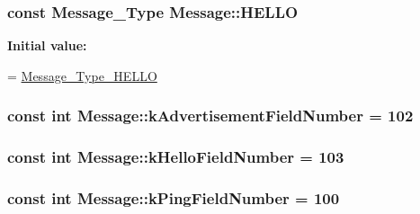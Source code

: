 \subsubsection[{\texorpdfstring{H\+E\+L\+LO}{HELLO}}]{\setlength{\rightskip}{0pt plus 5cm}const {\bf Message\+\_\+\+Type} Message\+::\+H\+E\+L\+LO\hspace{0.3cm}{\ttfamily [static]}}\hypertarget{class_message_a6bda6b58f826adddb08642316e32ed1f}{}\label{class_message_a6bda6b58f826adddb08642316e32ed1f}
{\bfseries Initial value\+:}
\begin{DoxyCode}
=
    \hyperlink{message_8pb_8h_a1b620cd54f3d6b48f3c5f7979545b160ab791bcd660645a863b5ea1a1f1a8291d}{Message\_Type\_HELLO}
\end{DoxyCode}
\subsubsection[{\texorpdfstring{k\+Advertisement\+Field\+Number}{kAdvertisementFieldNumber}}]{\setlength{\rightskip}{0pt plus 5cm}const int Message\+::k\+Advertisement\+Field\+Number = 102\hspace{0.3cm}{\ttfamily [static]}}\hypertarget{class_message_a75120b6dcf3c241e7e79c6244714031b}{}\label{class_message_a75120b6dcf3c241e7e79c6244714031b}
\subsubsection[{\texorpdfstring{k\+Hello\+Field\+Number}{kHelloFieldNumber}}]{\setlength{\rightskip}{0pt plus 5cm}const int Message\+::k\+Hello\+Field\+Number = 103\hspace{0.3cm}{\ttfamily [static]}}\hypertarget{class_message_a48c7ce9a4b7f9205834eb1f9c0b0d88a}{}\label{class_message_a48c7ce9a4b7f9205834eb1f9c0b0d88a}
\subsubsection[{\texorpdfstring{k\+Ping\+Field\+Number}{kPingFieldNumber}}]{\setlength{\rightskip}{0pt plus 5cm}const int Message\+::k\+Ping\+Field\+Number = 100\hspace{0.3cm}{\ttfamily [static]}}\hypertarget{class_message_a2197ba45f05dac9a2bd760c7b3a2d1a4}{}\label{class_message_a2197ba45f05dac9a2bd760c7b3a2d1a4}
